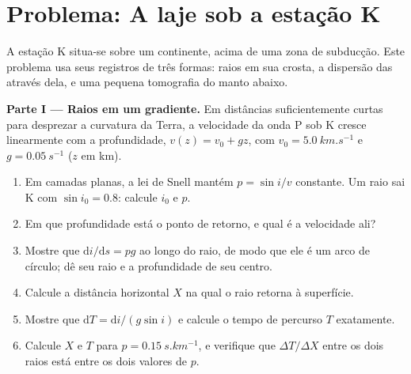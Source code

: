\section{Problema: A laje sob a estação K}

\begin{problem}
\label{pb:b3:seismology-imaging:1}
A estação K situa-se sobre um continente, acima de uma zona de subducção. Este problema usa seus
registros de três formas: raios em sua crosta, a dispersão das  através dela,
e uma pequena tomografia do manto abaixo.

\medskip
\noindent\textbf{Parte I --- Raios em um gradiente.} Em distâncias suficientemente curtas para
desprezar a curvatura da Terra, a velocidade da onda P sob K cresce linearmente com a profundidade,
$v(z) = v_0 + gz$, com $v_0 = \qty{5.0}{km.s^{-1}}$ e
$g = \qty{0.05}{s^{-1}}$ ($z$ em km).
\begin{enumerate}
  \item Em camadas planas, a lei de Snell mantém $p = \sin i/v$ constante. Um raio sai
        K com $\sin i_0 = 0.8$: calcule $i_0$ e $p$.
  \item Em que profundidade está o ponto de retorno, e qual é a velocidade ali?
  \item Mostre que $\mathrm di/\mathrm ds = pg$ ao longo do raio, de modo que ele é um
        arco de círculo; dê seu raio e a profundidade de seu centro.
  \item Calcule a distância horizontal $X$ na qual o raio retorna à
        superfície.
  \item Mostre que $\mathrm dT = \mathrm di/(g\sin i)$ e calcule o tempo de
        percurso $T$ exatamente.
  \item Calcule $X$ e $T$ para $p = \qty{0.15}{s.km^{-1}}$, e verifique que
        $\Delta T/\Delta X$ entre os dois raios está entre os dois valores
        de $p$.
\end{enumerate}


\end{problem}
